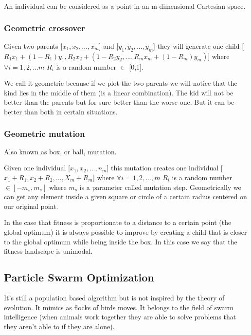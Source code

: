 \vspace{10pt}

An individual can be considered as a point in an m-dimensional Cartesian space. 

\subsubsection{Geometric crossover}

Given two parents [$x_1, x_2, ..., x_m$] and [$y_1, y_2, ..., y_m$] they will generate one child [$R_1 x_1 + (1-R_1)y_1, R_2x_2+(1-R_2y_2,...,R_m x_m+(1-R_m)y_m)$] where $\forall i = 1,2,...m$ $R_i$ is a random number $\in$  [0,1].

\vspace{10pt}

We call it geometric because if we plot the two parents we will notice that the kind lies in the middle of them (is a linear combination). The kid will not be better than the parents but for sure better than the worse one. But it can be better than both in certain situations.

\subsubsection{Geometric mutation}

Also known as box, or ball, mutation.

Given one individual [$x_1, x_2,...,n_m$] this mutation creates one individual [$x_1 + R_1, x_2 + R_2, ..., X_m + R_m$] where $\forall i = 1,2,..., m$ $ R_i$ is a random number $\in [-m_s, m_s]$ where $m_s$ is a parameter called mutation step. Geometrically we can get any element inside a given square or circle of a certain radius centered on our original point. 

\vspace{10pt}

In the case that fitness is proportionate to a distance to a certain point (the global optimum) it is always possible to improve by creating a child that is closer to the global optimum while being inside the box. In this case we say that the fitness landscape is unimodal. 



\subsection{Particle Swarm Optimization}

It's still a population based algorithm but is not inspired by the theory of evolution. It mimics as flocks of birds moves. It belongs to the field of swarm intelligence (when animals work together they are able to solve problems that they aren't able to if they are alone). 

